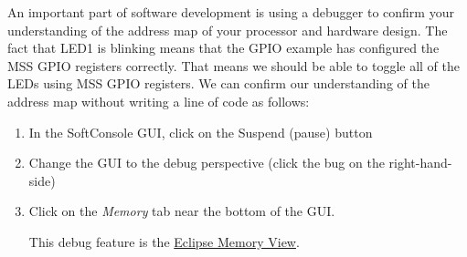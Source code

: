An important part of software development is using a debugger to confirm your
understanding of the address map of your processor and hardware design.
%
The fact that LED1 is blinking means that the GPIO example has configured the
MSS GPIO registers correctly. That means we should be able to toggle all of
the LEDs using MSS GPIO registers. We can confirm our understanding of the
address map without writing a line of code as follows:
%
\begin{enumerate}
\item In the SoftConsole GUI, click on the Suspend (pause) button

\item Change the GUI to the debug perspective (click the bug on the right-hand-side)

\item Click on the \emph{Memory} tab near the bottom of the GUI.

This debug feature is the
\href{https://help.eclipse.org/latest/index.jsp?topic=%2Forg.eclipse.cdt.doc.user%2Freference%2Fcdt_u_memoryview.htm}
{Eclipse Memory View}.


\end{enumerate}

